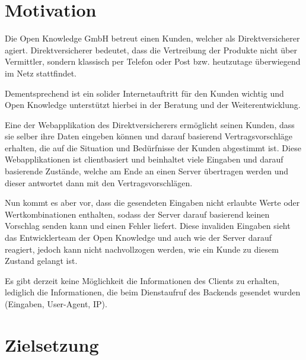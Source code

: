 \section{Motivation}

Die Open Knowledge GmbH betreut einen Kunden, welcher als Direktversicherer agiert. Direktversicherer bedeutet, dass die Vertreibung der Produkte nicht über Vermittler, sondern klassisch per Telefon oder Post bzw. heutzutage überwiegend im Netz stattfindet.

Dementsprechend ist ein solider Internetauftritt für den Kunden wichtig und Open Knowledge unterstützt hierbei in der Beratung und der Weiterentwicklung.

Eine der Webapplikation des Direktversicherers ermöglicht seinen Kunden, dass sie selber ihre Daten eingeben können und darauf basierend Vertragsvorschläge erhalten, die auf die Situation und Bedürfnisse der Kunden abgestimmt ist. Diese Webapplikationen ist clientbasiert und beinhaltet viele Eingaben und darauf basierende Zustände, welche am Ende an einen Server übertragen werden und dieser antwortet dann mit den Vertragsvorschlägen.

Nun kommt es aber vor, dass die gesendeten Eingaben nicht erlaubte Werte oder Wertkombinationen enthalten, sodass der Server darauf basierend keinen Vorschlag senden kann und einen Fehler liefert. Diese invaliden Eingaben sieht das Entwicklerteam der Open Knowledge und auch wie der Server darauf reagiert, jedoch kann nicht nachvollzogen werden, wie ein Kunde zu diesem Zustand gelangt ist. 

Es gibt derzeit keine Möglichkeit die Informationen des Clients zu erhalten, lediglich die Informationen, die beim Dienstaufruf des Backends gesendet wurden (Eingaben, User-Agent, IP).

\section{Zielsetzung}

